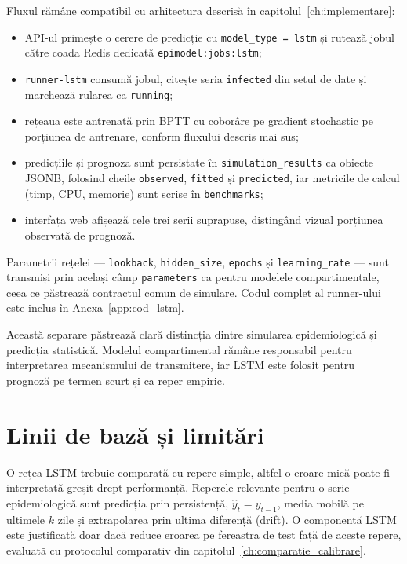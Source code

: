 Fluxul rămâne compatibil cu arhitectura descrisă în
capitolul~\ref{ch:implementare}:
\begin{itemize}
    \item API-ul primește o cerere de predicție cu \texttt{model\_type = lstm}
    și rutează jobul către coada Redis dedicată \texttt{epimodel:jobs:lstm};
    \item \texttt{runner-lstm} consumă jobul, citește seria \texttt{infected}
    din setul de date și marchează rularea ca \texttt{running};
    \item rețeaua este antrenată prin BPTT cu coborâre pe gradient stochastic
    pe porțiunea de antrenare, conform fluxului descris mai sus;
    \item predicțiile și prognoza sunt persistate în \texttt{simulation\_results}
    ca obiecte JSONB, folosind cheile \texttt{observed}, \texttt{fitted} și
    \texttt{predicted}, iar metricile de calcul (timp, CPU, memorie) sunt scrise
    în \texttt{benchmarks};
    \item interfața web afișează cele trei serii suprapuse, distingând vizual
    porțiunea observată de prognoză.
\end{itemize}
Parametrii rețelei --- \texttt{lookback}, \texttt{hidden\_size}, \texttt{epochs}
și \texttt{learning\_rate} --- sunt transmiși prin același câmp \texttt{parameters}
ca pentru modelele compartimentale, ceea ce păstrează contractul comun de
simulare. Codul complet al runner-ului este inclus în
Anexa~\ref{app:cod_lstm}.

Această separare păstrează clară distincția dintre simularea epidemiologică și
predicția statistică. Modelul compartimental rămâne responsabil pentru
interpretarea mecanismului de transmitere, iar LSTM este folosit pentru prognoză
pe termen scurt și ca reper empiric.

\section{Linii de bază și limitări}
\label{sec:limitari_lstm}

O rețea LSTM trebuie comparată cu repere simple, altfel o eroare mică poate fi
interpretată greșit drept performanță. Reperele relevante pentru o serie
epidemiologică sunt predicția prin persistență, $\hat{y}_{t}=y_{t-1}$, media
mobilă pe ultimele $k$ zile și extrapolarea prin ultima diferență (drift). O
componentă LSTM este justificată doar dacă reduce eroarea pe fereastra de test
față de aceste repere, evaluată cu protocolul comparativ din
capitolul~\ref{ch:comparatie_calibrare}.

